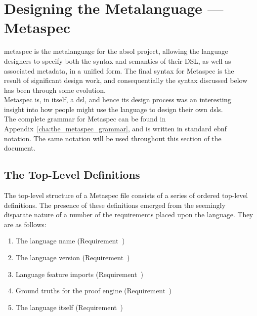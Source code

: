 \section{Designing the Metalanguage --- Metaspec} %
\label{sec:designing_the_metalanguage_metaspec}

\gls{metaspec} is the metalanguage for the \gls{absol} project, allowing the language designers to specify both the syntax and semantics of their DSL, as well as associated metadata, in a unified form. 
The final syntax for Metaspec is the result of significant design work, and consequentially the syntax discussed below has been through some evolution. \\

Metaspec is, in itself, a \gls{dsl}, and hence its design process was an interesting insight into how people might use the language to design their own \glspl{dsl}. \\

The complete grammar for Metaspec can be found in Appendix~\ref{cha:the_metaspec_grammar}, and is written in standard \gls{ebnf} notation. 
The same notation will be used throughout this section of the document. 

\subsection{The Top-Level Definitions} %
\label{sub:the_top_level_definitions}
The top-level structure of a Metaspec file consists of a series of ordered top-level definitions.
The presence of these definitions emerged from the seemingly disparate nature of a number of the requirements placed upon the language.
They are as follows:
\begin{enumerate}
    \item The language name (Requirement~)
    \item The language version (Requirement~)
    \item Language feature imports (Requirement~)
    \item Ground truths for the proof engine (Requirement~)
    \item The language itself (Requirement~)
\end{enumerate}


